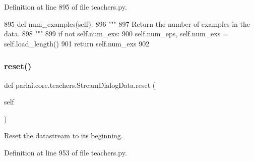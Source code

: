 Definition at line 895 of file teachers.\+py.


\begin{DoxyCode}
895     \textcolor{keyword}{def }num\_examples(self):
896         \textcolor{stringliteral}{"""}
897 \textcolor{stringliteral}{        Return the number of examples in the data.}
898 \textcolor{stringliteral}{        """}
899         \textcolor{keywordflow}{if} \textcolor{keywordflow}{not} self.num\_exs:
900             self.num\_eps, self.num\_exs = self.load\_length()
901         \textcolor{keywordflow}{return} self.num\_exs
902 
\end{DoxyCode}
\mbox{\label{classparlai_1_1core_1_1teachers_1_1StreamDialogData_a6375bd13d685da4b3449caaafcc5ec13}} 
\subsubsection{\texorpdfstring{reset()}{reset()}}
{\footnotesize\ttfamily def parlai.\+core.\+teachers.\+Stream\+Dialog\+Data.\+reset (\begin{DoxyParamCaption}\item[{}]{self }\end{DoxyParamCaption})}

\begin{DoxyVerb}Reset the datastream to its beginning.
\end{DoxyVerb}
 

Definition at line 953 of file teachers.\+py.


